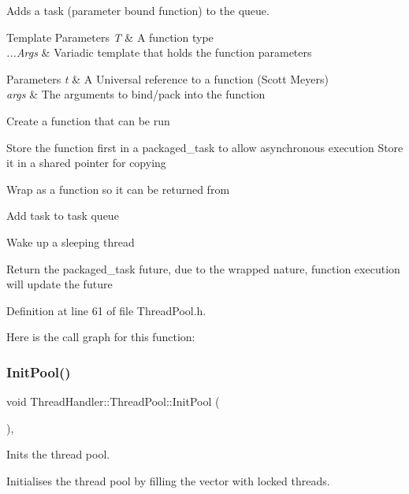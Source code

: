 Adds a task (parameter bound function) to the queue. 


\begin{DoxyTemplParams}{Template Parameters}
{\em T} & A function type \\
\hline
{\em ...\+Args} & Variadic template that holds the function parameters \\
\hline
\end{DoxyTemplParams}

\begin{DoxyParams}{Parameters}
{\em t} & A Universal reference to a function (Scott Meyers) \\
\hline
{\em args} & The arguments to bind/pack into the function \\
\hline
\end{DoxyParams}
Create a function that can be run

Store the function first in a packaged\+\_\+task to allow asynchronous execution Store it in a shared pointer for copying

Wrap as a function so it can be returned from

Add task to task queue

Wake up a sleeping thread

Return the packaged\+\_\+task future, due to the wrapped nature, function execution will update the future

Definition at line 61 of file Thread\+Pool.\+h.

Here is the call graph for this function\+:
\mbox{\label{classThreadHandler_1_1ThreadPool_aa4bd9362ff48ad5b08b7ccc611940761}} 
\subsubsection{\texorpdfstring{InitPool()}{InitPool()}}
{\footnotesize\ttfamily void Thread\+Handler\+::\+Thread\+Pool\+::\+Init\+Pool (\begin{DoxyParamCaption}{ }\end{DoxyParamCaption})\hspace{0.3cm}{\ttfamily [override]}, {\ttfamily [virtual]}}



Inits the thread pool. 

Initialises the thread pool by filling the vector with locked threads. 

